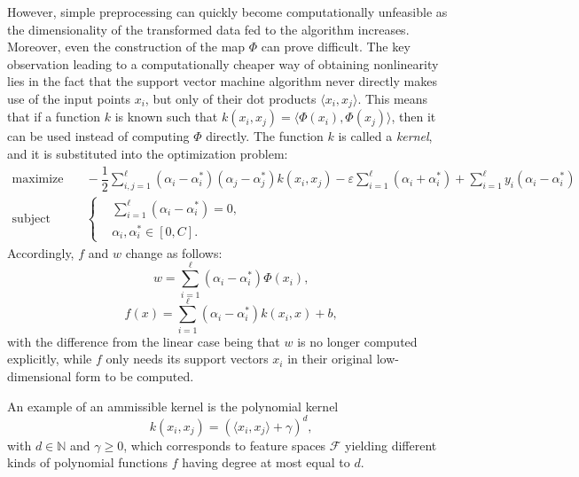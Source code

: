 \documentclass[12pt]{report}
\begin{document}
However, simple preprocessing can quickly become computationally unfeasible as the dimensionality of the transformed data fed to the algorithm increases. Moreover, even the construction of the map $\Phi$ can prove difficult. The key observation leading to a computationally cheaper way of obtaining nonlinearity lies in the fact that the support vector machine algorithm never directly makes use of the input points $ x_{i} $, but only of their dot products $ \langle x_{i},x_{j} \rangle $. This means that if a function $ k $ is known such that $ k(x_{i},x_{j}) = \langle\Phi (x_{i}),\Phi (x_{j})\rangle $, then it can be used instead of computing $ \Phi $ directly. The function $ k $ is called a \textit{kernel}, and it is substituted into the optimization problem:
\begin{equation} \label{kernelsmargdual}
\begin{split}
\text{maximize} &\quad
-\dfrac{1}{2}\sum_{i,j=1}^{\ell}(\alpha_{i} - \alpha_{i}^{*})(\alpha_{j} - \alpha_{j}^{*})k(x_{i},x_{j}) -\varepsilon\sum_{i=1}^{\ell}(\alpha_{i} + \alpha_{i}^{*}) + \sum_{i=1}^{\ell}y_{i}(\alpha_{i}-\alpha_{i}^{*}) \\
\text{subject to} &\quad \left\{\begin{split}
&\sum_{i=1}^{\ell}(\alpha_{i} - \alpha_{i}^{*}) = 0 \text{,}\\
&\alpha_{i},\alpha_{i}^{*} \in [0,C] \text{.}
\end{split}\right.
\end{split}
\end{equation}
Accordingly, $ f $ and $ w $ change as follows:
\begin{equation} \label{wnonlinear}
w = \sum_{i=1}^{\ell}(\alpha_{i}-\alpha_{i}^{*})\Phi(x_{i}) \text{,}
\end{equation}
\begin{equation} \label{kernelfsvexp}
f(x) = \sum_{i=1}^{\ell}(\alpha_{i}-\alpha_{i}^{*})k(x_{i},x) + b \text{,}
\end{equation}
with the difference from the linear case being that $ w $ is no longer computed explicitly, while $ f $ only needs its support vectors $ x_{i} $ in their original low-dimensional form to be computed.

An example of an ammissible kernel is the polynomial kernel
\begin{equation} \label{polykernel}
k(x_{i},x_{j}) = (\langle x_{i},x_{j} \rangle + \gamma)^{d} \text{,}
\end{equation}
with $ d \in \mathbb{N} $ and $ \gamma \geq 0 $, which corresponds to feature spaces $ \mathcal{F} $ yielding different kinds of polynomial functions $ f $ having degree at most equal to $d$.
\end{document}
